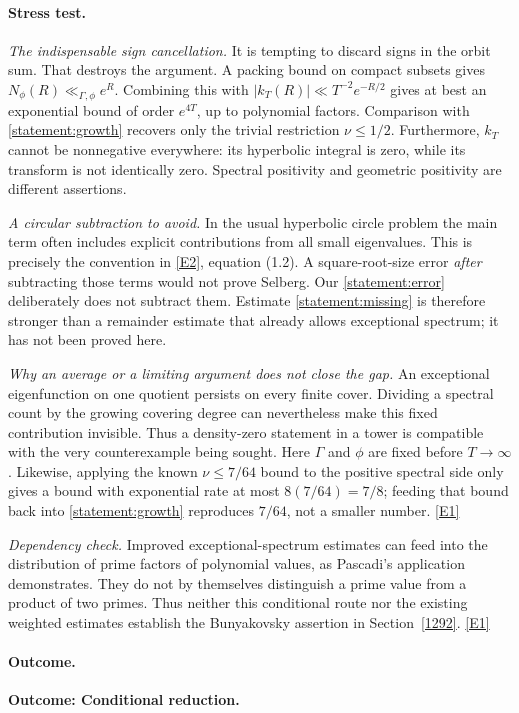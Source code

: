 \documentclass[11pt]{article}
\newcommand{\eref}[2]{\hyperlink{extra:#1:#2}{[E#2]}}
\begin{document}
\paragraph{Stress test.}
\emph{The indispensable sign cancellation.}
It is tempting to discard signs in the orbit sum. That destroys the argument.
A packing bound on compact subsets gives $N_\phi(R)\ll_{\Gamma,\phi}e^R$.
Combining this with $|k_T(R)|\ll T^{-2}e^{-R/2}$ gives at best an exponential
bound of order $e^{4T}$, up to polynomial factors. Comparison with
\eqref{statement:growth} recovers only the trivial restriction $\nu\le1/2$.
Furthermore, $k_T$ cannot be nonnegative everywhere: its hyperbolic integral
is zero, while its transform is not identically zero. Spectral positivity
and geometric positivity are different assertions.

\emph{A circular subtraction to avoid.}
In the usual hyperbolic circle problem the main term often includes explicit
contributions from all small eigenvalues. This is precisely the convention
in \eref{statement}{2}, equation (1.2). A square-root-size error \emph{after}
subtracting those terms would not prove Selberg. Our
\eqref{statement:error} deliberately does not subtract them. Estimate
\eqref{statement:missing} is therefore stronger than a remainder estimate that
already allows exceptional spectrum; it has not been proved here.

\emph{Why an average or a limiting argument does not close the gap.}
An exceptional eigenfunction on one quotient persists on every finite cover.
Dividing a spectral count by the growing covering degree can nevertheless
make this fixed contribution invisible. Thus a density-zero statement in a
tower is compatible with the very counterexample being sought. Here $\Gamma$
and $\phi$ are fixed before $T\to\infty$. Likewise, applying the known
$\nu\le7/64$ bound to the positive spectral side only gives a bound with
exponential rate at most $8(7/64)=7/8$; feeding that bound back into
\eqref{statement:growth} reproduces $7/64$, not a smaller number.
\eref{statement}{1}

\emph{Dependency check.}
Improved exceptional-spectrum estimates can feed into the distribution of
prime factors of polynomial values, as Pascadi's application demonstrates.
They do not by themselves distinguish a prime value from a product of two
primes. Thus neither this conditional route nor the existing weighted
estimates establish the Bunyakovsky assertion in Section~\ref{1292}.
\eref{statement}{1}

\paragraph{Outcome.}
\textbf{Outcome: Conditional reduction.}
\end{document}
